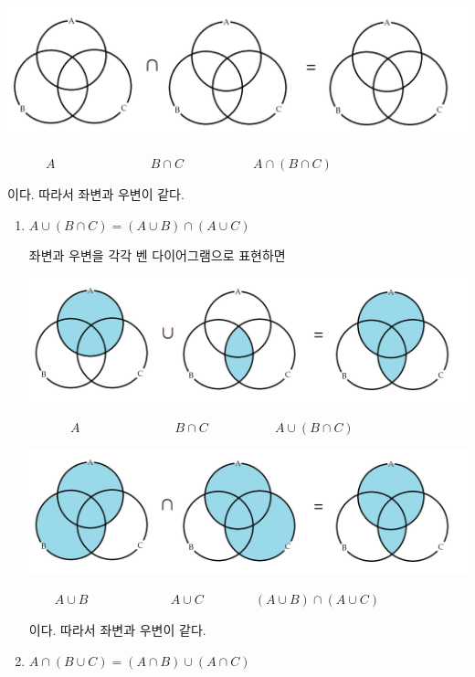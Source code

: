 \documentclass{oblivoir}
\begin{document}
\begin{enumerate}
\begin{mdframed}
\includegraphics[width=.9\textwidth]{three_set_rule_cap}
\par\vspace{-10pt}
\(\qquad\quad A\qquad\qquad\qquad\quad\:\:B\cap C
\qquad\qquad\quad\:\: A\cap (B\cap C)\)
\par
이다.
따라서 좌변과 우변이 같다.
\end{mdframed}
\end{enumerate}
\newpage
%
\begin{enumerate}\label{properties4}
\item
\(A\cup(B\cap C)=(A\cup B)\cap(A\cup C)\)
\begin{mdframed}
좌변과 우변을 각각 벤 다이어그램으로 표현하면
\par
\includegraphics[width=.9\textwidth]{properties_4-1}
\par\vspace{-10pt}
\(\qquad\quad\:A\qquad\qquad\qquad\quad\:\:B\cap C
\qquad\qquad\quad\:A\cup(B\cap C)\)
\par
\includegraphics[width=.9\textwidth]{properties_4-2}
\par\vspace{-10pt}
\(\qquad A\cup B\qquad\qquad\qquad\:\:A\cup C
\qquad\qquad(A\cup B)\cap(A\cup C)\)
\par
이다.
따라서 좌변과 우변이 같다.
\end{mdframed}
\item
\(A\cap(B\cup C)=(A\cap B)\cup(A\cap C)\)

\end{enumerate}
\end{document}
